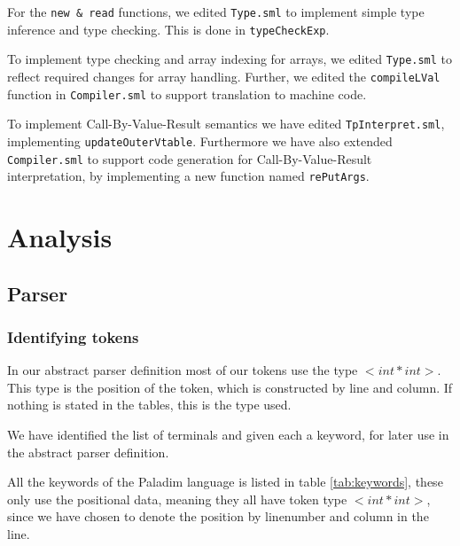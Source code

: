\documentclass[10pt]{article}
\begin{document}
For the \texttt{new \& read} functions, we edited \texttt{Type.sml} to implement simple type inference and type checking. This is done in \texttt{typeCheckExp}.

To implement type checking and array indexing for arrays, we edited \texttt{Type.sml} to reflect required changes for array handling. Further, we edited the \texttt{compileLVal} function in \texttt{Compiler.sml} to support translation to machine code.

To implement Call-By-Value-Result semantics we have edited \texttt{TpInterpret.sml}, implementing \texttt{updateOuterVtable}. Furthermore we have also extended \texttt{Compiler.sml} to support code generation for Call-By-Value-Result interpretation, by implementing a new function named \texttt{rePutArgs}.

\section{Analysis}
\subsection{Parser}
\subsubsection{Identifying tokens}
In our abstract parser definition most of our tokens use the type $<int*int>$. This type is the position of the token, which is constructed by line and column. If nothing is stated in the tables, this is the type used.

We have identified the list of terminals and given each a keyword, for later use in the abstract parser definition.

All the keywords of the Paladim language is listed in table \ref{tab:keywords}, these only use the positional data, meaning they all have token type $<int*int>$, since we have chosen to denote the position by linenumber and column in the line.
\end{document}
